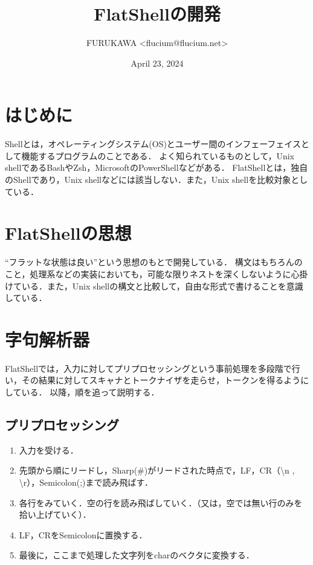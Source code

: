 \documentclass{article}
\title{FlatShellの開発}
\author{FURUKAWA \textless flucium@flucium.net\textgreater }
\date{April 23, 2024}
\begin{document}
\maketitle

\section*{はじめに}
Shellとは，オペレーティングシステム(OS)とユーザー間のインフェーフェイスとして機能するプログラムのことである．\newline
よく知られているものとして，Unix shellであるBashやZsh，MicrosoftのPowerShellなどがある．\newline
FlatShellとは，独自のShellであり，Unix shellなどには該当しない．また，Unix shellを比較対象としている．

\section{FlatShellの思想}
“フラットな状態は良い”という思想のもとで開発している．\newline
構文はもちろんのこと，処理系などの実装においても，可能な限りネストを深くしないように心掛けている．また，Unix shellの構文と比較して，自由な形式で書けることを意識している．

\section{字句解析器}
FlatShellでは，入力に対してプリプロセッシングという事前処理を多段階で行い，その結果に対してスキャナとトークナイザを走らせ，トークンを得るようにしている．\newline
以降，順を追って説明する．

\subsection{プリプロセッシング}
\begin{enumerate}
    \item 入力を受ける．
    \item 先頭から順にリードし，Sharp(\#)がリードされた時点で，LF，CR（\textbackslash n , \textbackslash r），Semicolon(;)まで読み飛ばす．
    \item 各行をみていく．空の行を読み飛ばしていく．（又は，空では無い行のみを拾い上げていく）．
    \item LF，CRをSemicolonに置換する．
    \item 最後に，ここまで処理した文字列をcharのベクタに変換する．
\end{enumerate}
\end{document}
